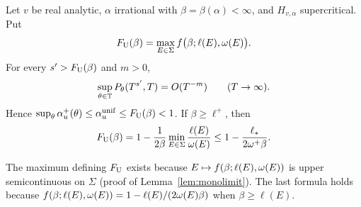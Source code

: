\begin{theorem}\label{thm:U}
Let $v$ be real analytic, $\alpha$ irrational with $\beta=\beta(\alpha)<\infty$, and $H_{v,\alpha}$ supercritical. Put
\[
F_{\mathrm U}(\beta)=\max_{E\in\Sigma}f\bigl(\beta;\ell(E),\omega(E)\bigr).
\]
For every $s'>F_{\mathrm U}(\beta)$ and $m>0$,
\[
\sup_{\theta\in\mathbb T}P_\theta(T^{s'},T)=O(T^{-m})\qquad(T\to\infty).
\]
Hence $\sup_\theta\alpha_u^+(\theta)\le\alpha_u^{\mathrm{unif}}\le F_{\mathrm U}(\beta)<1$. If $\beta\ge\ell^+$, then
\[
F_{\mathrm U}(\beta)=1-\frac1{2\beta}\min_{E\in\Sigma}\frac{\ell(E)}{\omega(E)}\le1-\frac{\ell_*}{2\omega^+\beta}.
\]
\end{theorem}

The maximum defining $F_{\mathrm U}$ exists because $E\mapsto f(\beta;\ell(E),\omega(E))$ is upper semicontinuous on $\Sigma$ (proof of Lemma~\ref{lem:monolimit}). The last formula holds because $f(\beta;\ell(E),\omega(E))=1-\ell(E)/(2\omega(E)\beta)$ when $\beta\ge\ell(E)$.

